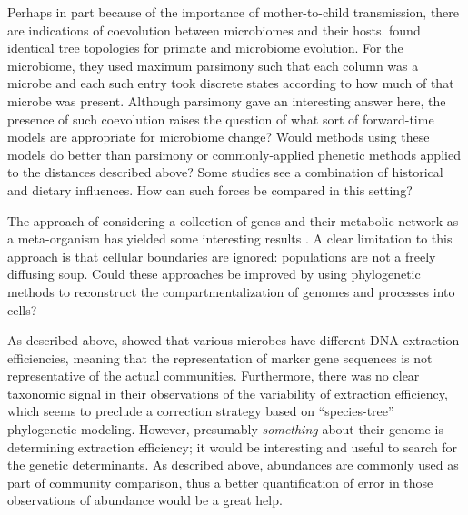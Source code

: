 \documentclass{amsart}
\begin{document}
Perhaps in part because of the importance of mother-to-child transmission, there are indications of coevolution between microbiomes and their hosts.
\citet{ochman2010evolutionary} found identical tree topologies for primate and microbiome evolution.
For the microbiome, they used maximum parsimony such that each column was a microbe and each such entry took discrete states according to how much of that microbe was present.
Although parsimony gave an interesting answer here, the presence of such coevolution raises the question of what sort of forward-time models are appropriate for microbiome change?
Would methods using these models do better than parsimony or commonly-applied phenetic methods applied to the distances described above?
Some studies \citep[e.g.][]{phillips2012microbiome,delsuc2013convergence} see a combination of historical and dietary influences.
How can such forces be compared in this setting?

The approach of considering a collection of genes and their metabolic network as a meta-organism has yielded some interesting results \citep{borenstein2008large,greenblum2012metagenomic}.
A clear limitation to this approach is that cellular boundaries are ignored: populations are not a freely diffusing soup.
Could these approaches be improved by using phylogenetic methods to reconstruct the compartmentalization of genomes and processes into cells?

As described above, \citet{morgan2010metagenomic} showed that various microbes have different DNA extraction efficiencies, meaning that the representation of marker gene sequences is not representative of the actual communities.
Furthermore, there was no clear taxonomic signal in their observations of the variability of extraction efficiency, which seems to preclude a correction strategy based on ``species-tree'' phylogenetic modeling.
However, presumably \textit{something} about their genome is determining extraction efficiency; it would be interesting and useful to search for the genetic determinants.
As described above, abundances are commonly used as part of community comparison, thus a better quantification of error in those observations of abundance would be a great help.
\end{document}

